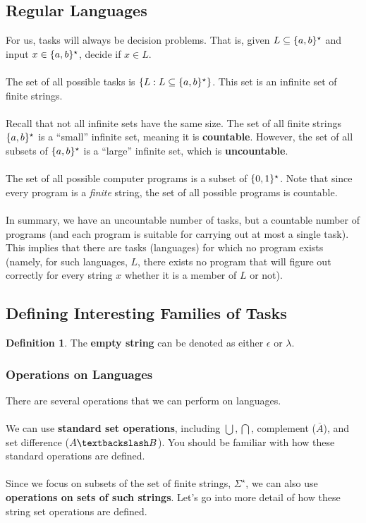 \documentclass[]{article}
\DeclarePairedDelimiter{\set}{\lbrace}{\rbrace}
\theoremstyle{definition}
\newtheorem*{defn}{Definition}
\newcommand{\lecture}[1]{\marginpar{{\footnotesize $\leftarrow$ \underline{#1}}}}
\begin{document}
      \subsection{Regular Languages}
        For us, tasks will always be decision problems. That is, given $L \subseteq \set{a, b}^\star$ and input $x \in \set{a, b}^\star$, decide if $x \in L$.
        \\ \\
        The set of all possible tasks is $\set{L : L \subseteq \set{a, b}^\star}$. This set is an infinite set of finite strings.
        \\ \\
        Recall that not all infinite sets have the same size. The set of all finite strings $\set{a, b}^\star$ is a ``small'' infinite set, meaning it is \textbf{countable}. However, the set of all subsets of $\set{a, b}^\star$ is a ``large'' infinite set, which is \textbf{uncountable}.
        \\ \\
        The set of all possible computer programs is a subset of $\set{0, 1}^\star$. Note that since every program is a \emph{finite} string, the set of all possible programs is countable.
        \\ \\
        In summary, we have an uncountable number of tasks, but a countable number of programs (and each program is suitable for carrying out at most a single task). This implies that there are tasks (languages) for which no program exists (namely, for such languages, $L$, there exists no program that will figure out correctly for every string $x$ whether it is a member of $L$ or not).

      \subsection{Defining Interesting Families of Tasks} \lecture{September 17, 2013}
        \begin{defn}
          The \textbf{empty string} can be denoted as either $\epsilon$ or $\lambda$.
        \end{defn}

        \subsubsection{Operations on Languages}
          There are several operations that we can perform on languages.
          \\ \\
          We can use \textbf{standard set operations}, including $\bigcup, \bigcap$, complement ($\overline A$), and set difference ($A \textbackslash B$). You should be familiar with how these standard operations are defined.
          \\ \\
          Since we focus on subsets of the set of finite strings, $\Sigma^\star$, we can also use \textbf{operations on sets of such strings}. Let's go into more detail of how these string set operations are defined.
\end{document}
